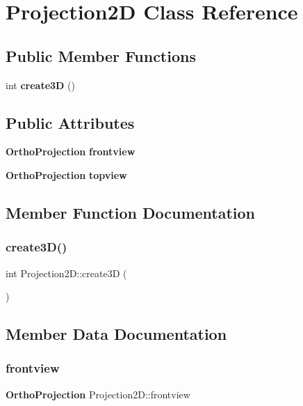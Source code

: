 \section{Projection2D Class Reference}
\label{class_projection2_d}
\subsection*{Public Member Functions}
\begin{DoxyCompactItemize}
\item 
int \textbf{ create3D} ()
\end{DoxyCompactItemize}
\subsection*{Public Attributes}
\begin{DoxyCompactItemize}
\item 
\textbf{ Ortho\+Projection} \textbf{ frontview}
\item 
\textbf{ Ortho\+Projection} \textbf{ topview}
\end{DoxyCompactItemize}


\subsection{Member Function Documentation}
\mbox{\label{class_projection2_d_a02e2cbca6d928a05400597693cbb6a08}} 
\subsubsection{create3\+D()}
{\footnotesize\ttfamily int Projection2\+D\+::create3D (\begin{DoxyParamCaption}{ }\end{DoxyParamCaption})}



\subsection{Member Data Documentation}
\mbox{\label{class_projection2_d_a1eb4d010190b1bd62bf0f9c4e4afc88a}} 
\subsubsection{frontview}
{\footnotesize\ttfamily \textbf{ Ortho\+Projection} Projection2\+D\+::frontview}

